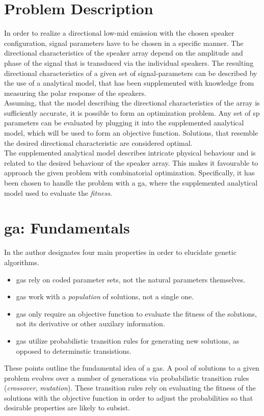\section{Problem Description}
In order to realize a directional low-mid emission with the chosen speaker configuration, signal parameters have to be chosen in a specific manner. The directional characteristics of the speaker array depend on the amplitude and phase of the signal that is transduced via the individual speakers. The resulting directional characteristics of a given set of signal-parameters can be described by the use of a analytical model, that has been supplemented with knowledge from measuring the polar response of the speakers.\\
Assuming, that the model describing the directional characteristics of the array is sufficiently accurate, it is possible to form an optimization problem. Any set of \gls{sp} parameters can be evaluated by plugging it into the supplemented analytical model, which will be used to form an objective function. Solutions, that resemble the desired directional characteristic are considered optimal.\\
The supplemented analytical model describes intricate physical behaviour and is related to the desired behaviour of the speaker array.  This makes it favourable to approach the given problem with combinatorial optimization. Specifically, it has been chosen to handle the problem with a \gls{ga}, where the supplemented analytical model used to evaluate the \textit{fitness}.


\section{\gls{ga}: Fundamentals}
In \citep[p. 7]{goldberg89} the author designates four main properties in order to elucidate genetic algorithms. 
\begin{itemize}
\item \gls{ga}s rely on coded parameter sets, not the natural parameters themselves.
\item \gls{ga}s work with a \textit{population} of solutions, not a single one.
\item \gls{ga}s only require an objective function to evaluate the fitness of the solutions, not its derivative or other auxilary information.
\item \gls{ga}s utilize probabilistic transition rules for generating new solutions, as opposed to determinstic transistions.
\end{itemize}
These points outline the fundamental idea of a \gls{ga}s. A pool of solutions to a given problem evolves over a number of generations via probabilistic transition rules (\textit{crossover}, \textit{mutation}).
These transition rules rely on evaluating the fitness of the solutions with the objective function in order to adjust the probabilities so that desirable properties are likely to subsist.
\citep{genetic_survey}

